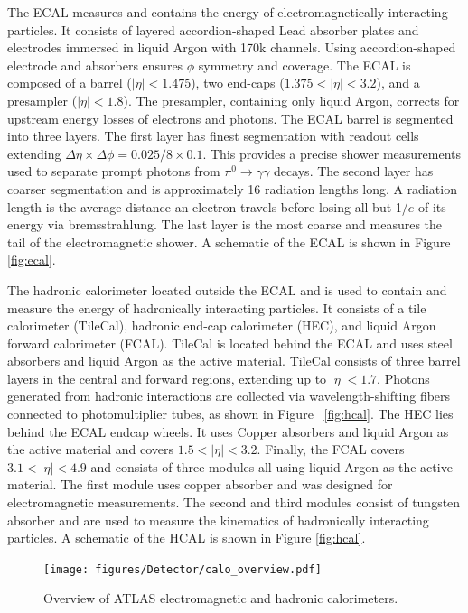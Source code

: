 The ECAL measures and contains the energy of electromagnetically interacting particles. It consists of layered accordion-shaped Lead absorber plates and electrodes immersed in liquid Argon with 170k channels. Using accordion-shaped electrode and absorbers ensures $\phi$ symmetry and coverage. The ECAL is composed of a barrel ($|\eta| < 1.475$), two end-caps ($1.375<|\eta| < 3.2$), and a presampler ($|\eta| < 1.8$).  The presampler, containing only liquid Argon, corrects for upstream energy losses of electrons and photons. The ECAL barrel is segmented into three layers. The first layer has finest segmentation with readout cells extending $\Delta \eta \times \Delta \phi = 0.025/8 \times 0.1$. This provides a precise shower measurements used to separate prompt photons from $\pi^{0} \rightarrow \gamma \gamma$ decays. The second layer has coarser segmentation and is approximately 16 radiation lengths long. A radiation length is the average distance an electron travels before losing all but 1/$e$ of its energy via bremsstrahlung. The last layer is the most coarse and measures the tail of the electromagnetic shower. A schematic of the ECAL is shown in Figure \ref{fig:ecal}. 

The hadronic calorimeter located outside the ECAL and is used to contain and measure the energy of hadronically interacting particles. It consists of a tile calorimeter (TileCal), hadronic end-cap calorimeter (HEC), and liquid Argon forward calorimeter (FCAL). TileCal is located behind the ECAL and uses steel absorbers and liquid Argon as the active material. TileCal consists of three barrel layers in the central and forward regions, extending up to $|\eta| < 1.7$. Photons generated from hadronic interactions are collected via wavelength-shifting fibers connected to photomultiplier tubes, as shown in Figure ~\ref{fig:hcal}. The HEC lies behind the ECAL endcap wheels. It uses Copper absorbers and liquid Argon as the active material and covers $1.5 < |\eta| < 3.2$. Finally, the FCAL covers $3.1 < |\eta| < 4.9$ and consists of three modules all using liquid Argon as the active material. The first module uses copper absorber and was designed for electromagnetic measurements. The second and third modules consist of tungsten absorber and are used to measure the kinematics of hadronically interacting particles. A schematic of the HCAL is shown in Figure \ref{fig:hcal}. 

\begin{figure}[h!]
  \centering
  \texttt{[image: figures/Detector/calo\_overview.pdf]}
  \caption{Overview of ATLAS electromagnetic and hadronic calorimeters.} 
  \label{fig:calo_overview}
\end{figure}
\FloatBarrier


